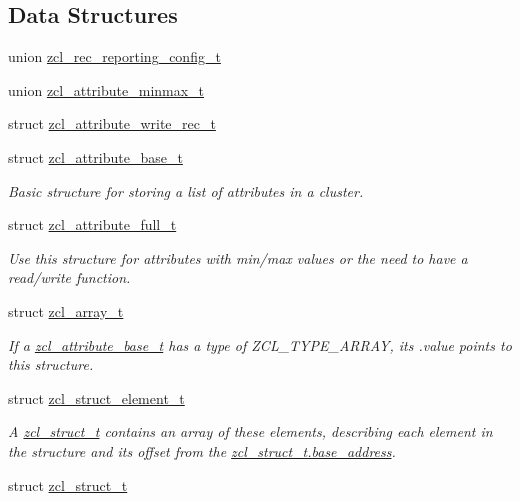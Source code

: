 \subsection*{Data Structures}
\begin{DoxyCompactItemize}
\item 
union \hyperlink{unionzcl__rec__reporting__config__t}{zcl\+\_\+rec\+\_\+reporting\+\_\+config\+\_\+t}
\item 
union \hyperlink{unionzcl__attribute__minmax__t}{zcl\+\_\+attribute\+\_\+minmax\+\_\+t}
\item 
struct \hyperlink{structzcl__attribute__write__rec__t}{zcl\+\_\+attribute\+\_\+write\+\_\+rec\+\_\+t}
\item 
struct \hyperlink{structzcl__attribute__base__t}{zcl\+\_\+attribute\+\_\+base\+\_\+t}
\begin{DoxyCompactList}\small\item\em Basic structure for storing a list of attributes in a cluster. \end{DoxyCompactList}\item 
struct \hyperlink{structzcl__attribute__full__t}{zcl\+\_\+attribute\+\_\+full\+\_\+t}
\begin{DoxyCompactList}\small\item\em Use this structure for attributes with min/max values or the need to have a read/write function. \end{DoxyCompactList}\item 
struct \hyperlink{structzcl__array__t}{zcl\+\_\+array\+\_\+t}
\begin{DoxyCompactList}\small\item\em If a \hyperlink{structzcl__attribute__base__t}{zcl\+\_\+attribute\+\_\+base\+\_\+t} has a type of Z\+C\+L\+\_\+\+T\+Y\+P\+E\+\_\+\+A\+R\+R\+AY, its .value points to this structure. \end{DoxyCompactList}\item 
struct \hyperlink{structzcl__struct__element__t}{zcl\+\_\+struct\+\_\+element\+\_\+t}
\begin{DoxyCompactList}\small\item\em A \hyperlink{structzcl__struct__t}{zcl\+\_\+struct\+\_\+t} contains an array of these elements, describing each element in the structure and its offset from the \hyperlink{group__zcl_ga2c4fcaeccedd1b62207f9bb03a26fdf1}{zcl\+\_\+struct\+\_\+t.\+base\+\_\+address}. \end{DoxyCompactList}\item 
struct \hyperlink{structzcl__struct__t}{zcl\+\_\+struct\+\_\+t}

\end{DoxyCompactItemize}

